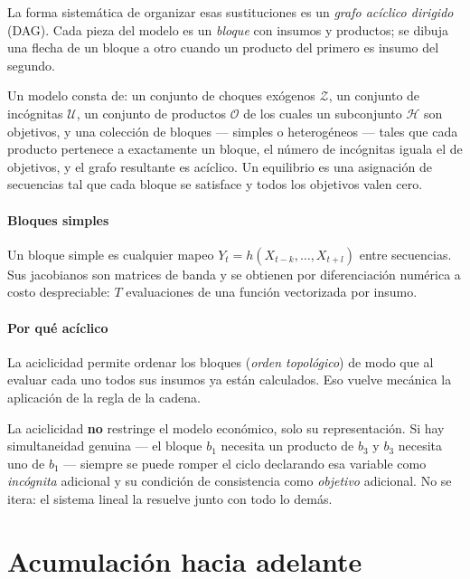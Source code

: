 La forma sistemática de organizar esas sustituciones es un \emph{grafo acíclico
dirigido} (DAG). Cada pieza del modelo es un \emph{bloque} con insumos y
productos; se dibuja una flecha de un bloque a otro cuando un producto del
primero es insumo del segundo.

\begin{definicion}
Un modelo consta de: un conjunto de choques exógenos $\mathcal{Z}$, un conjunto
de incógnitas $\mathcal{U}$, un conjunto de productos $\mathcal{O}$ de los cuales
un subconjunto $\mathcal{H}$ son objetivos, y una colección de bloques --- simples
o heterogéneos --- tales que cada producto pertenece a exactamente un bloque, el
número de incógnitas iguala el de objetivos, y el grafo resultante es acíclico.
Un equilibrio es una asignación de secuencias tal que cada bloque se satisface y
todos los objetivos valen cero.
\end{definicion}

\paragraph{Bloques simples} Un bloque simple es cualquier mapeo
$Y_t = h(X_{t-k},\dots,X_{t+l})$ entre secuencias. Sus jacobianos son matrices
de banda y se obtienen por diferenciación numérica a costo despreciable: $T$
evaluaciones de una función vectorizada por insumo.

\paragraph{Por qué acíclico} La aciclicidad permite ordenar los bloques
(\emph{orden topológico}) de modo que al evaluar cada uno todos sus insumos ya
están calculados. Eso vuelve mecánica la aplicación de la regla de la cadena.

\begin{idea}
La aciclicidad \textbf{no} restringe el modelo económico, solo su representación.
Si hay simultaneidad genuina --- el bloque $b_1$ necesita un producto de $b_3$ y
$b_3$ necesita uno de $b_1$ --- siempre se puede romper el ciclo declarando esa
variable como \emph{incógnita} adicional y su condición de consistencia como
\emph{objetivo} adicional. No se itera: el sistema lineal la resuelve junto con
todo lo demás.
\end{idea}

\section{Acumulación hacia adelante}

